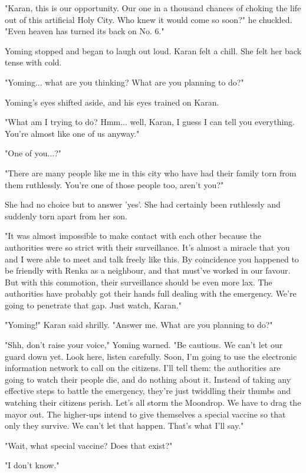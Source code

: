"Karan, this is our opportunity. Our one in a thousand chances of
choking the life out of this artificial Holy City. Who knew it would
come so soon?" he chuckled. "Even heaven has turned its back on No. 6."

Yoming stopped and began to laugh out loud. Karan felt a chill. She felt
her back tense with cold.

"Yoming... what are you thinking? What are you planning to do?"

Yoming's eyes shifted aside, and his eyes trained on Karan.

"What am I trying to do? Hmm... well, Karan, I guess I can tell you
everything. You're almost like one of us anyway."

"One of you...?"

"There are many people like me in this city who have had their family
torn from them ruthlessly. You're one of those people too, aren't you?"

She had no choice but to answer 'yes'. She had certainly been ruthlessly
and suddenly torn apart from her son.

"It was almost impossible to make contact with each other because the
authorities were so strict with their surveillance. It's almost a
miracle that you and I were able to meet and talk freely like this. By
coincidence you happened to be friendly with Renka as a neighbour, and
that must've worked in our favour. But with this commotion, their
surveillance should be even more lax. The authorities have probably got
their hands full dealing with the emergency. We're going to penetrate
that gap. Just watch, Karan."

"Yoming!" Karan said shrilly. "Answer me. What are you planning to do?"

"Shh, don't raise your voice," Yoming warned. "Be cautious. We can't let
our guard down yet. Look here, listen carefully. Soon, I'm going to use
the electronic information network to call on the citizens. I'll tell
them: the authorities are going to watch their people die, and do
nothing about it. Instead of taking any effective steps to battle the
emergency, they're just twiddling their thumbs and watching their
citizens perish. Let's all storm the Moondrop. We have to drag the mayor
out. The higher-ups intend to give themselves a special vaccine so that
only they survive. We can't let that happen. That's what I'll say."

"Wait, what special vaccine? Does that exist?"

"I don't know."

